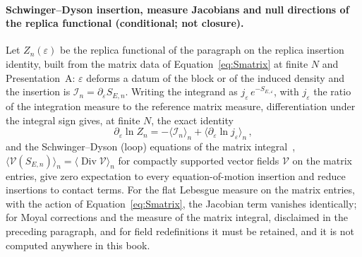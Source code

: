 \paragraph{Schwinger--Dyson insertion, measure Jacobians and null directions of the replica functional (conditional; not closure).}
Let \(Z_n(\varepsilon)\) be the replica functional of the paragraph on the replica insertion identity, built from the matrix data of Equation~\eqref{eq:Smatrix} at finite \(N\) and Presentation~A: \(\varepsilon\) deforms a datum of the block or of the induced density and the insertion is \(\mathcal I_n=\partial_\varepsilon S_{E,n}\). Writing the integrand as \(j_\varepsilon\,e^{-S_{E,\varepsilon}}\), with \(j_\varepsilon\) the ratio of the integration measure to the reference matrix measure, differentiation under the integral sign gives, at finite \(N\), the exact identity
\[
  \partial_\varepsilon\ln Z_n=-\langle\mathcal I_n\rangle_n+\langle\partial_\varepsilon\ln j_\varepsilon\rangle_n\,,
\]
and the Schwinger--Dyson (loop) equations of the matrix integral~\cite{EynardOrantin2009}, \(\langle\mathcal V(S_{E,n})\rangle_n=\langle\operatorname{Div}\mathcal V\rangle_n\) for compactly supported vector fields \(\mathcal V\) on the matrix entries, give zero expectation to every equation-of-motion insertion and reduce insertions to contact terms. For the flat Lebesgue measure on the matrix entries, with the action of Equation~\eqref{eq:Smatrix}, the Jacobian term vanishes identically; for Moyal corrections and the measure of the matrix integral, disclaimed in the preceding paragraph, and for field redefinitions it must be retained, and it is not computed anywhere in this book.

